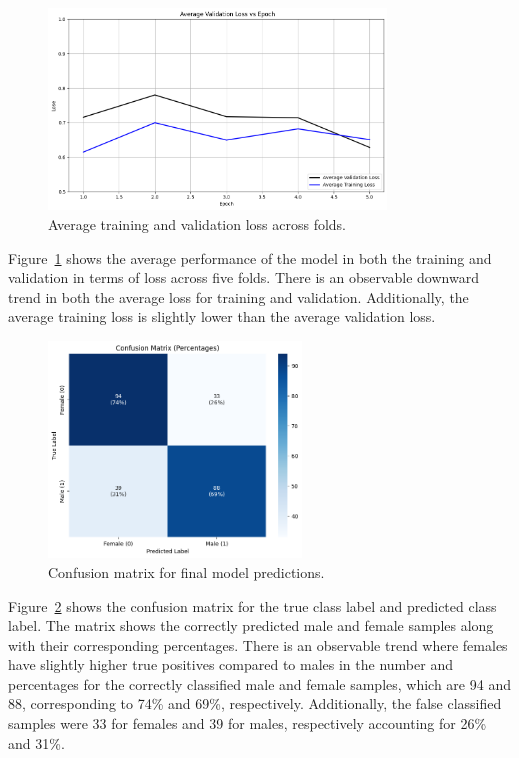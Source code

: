 \begin{figure}[!htbp]
	\centering
	\includegraphics[width=0.8\textwidth]{figures/avg_loss.png}
	\caption{Average training and validation loss across folds.}
	\label{fig:atvlaf}
\end{figure}

Figure~\ref{fig:atvlaf} shows the average performance of the model in both the training and validation in terms of loss across five folds. There is an observable downward trend in both the average loss for training and validation. Additionally, the average training loss is slightly lower than the average validation loss.

\newpage
\begin{figure}[!htbp]
	\centering
	\includegraphics[width=0.6\textwidth]{figures/cm_dl.png}
	\caption{Confusion matrix for final model predictions.}
	\label{fig:cm_dl}
\end{figure}

Figure~\ref{fig:cm_dl} shows the confusion matrix for the true class label and predicted class label. The matrix shows the correctly predicted male and female samples along with their corresponding percentages. There is an observable trend where females have slightly higher true positives compared to males in the number and percentages for the correctly classified male and female samples, which are 94 and 88, corresponding to 74\% and 69\%, respectively. Additionally, the false classified samples were 33 for females and 39 for males, respectively accounting for 26\% and 31\%.

